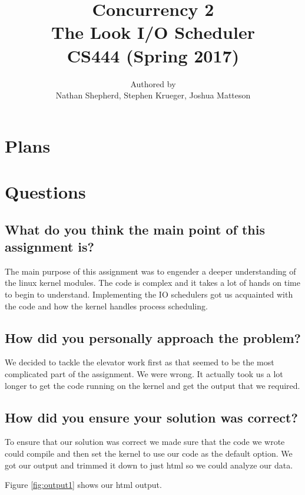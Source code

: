 \documentclass[letterpaper,10pt,titlepage, onecolumn, compsoc]{IEEEtran}
\title{Concurrency 2 \\The Look I/O Scheduler \\ \vspace{2mm}\small CS444 (Spring 2017)}
\author{Authored by \\ Nathan Shepherd, Stephen Krueger, Joshua Matteson }
\begin{document}
\maketitle
\newpage


\section{Plans}




\section{Questions}

\subsection{What do you think the main point of this assignment is?}
The main purpose of this assignment was to engender a deeper understanding of the linux kernel modules. The code is complex and it takes a lot of hands on time to begin to understand. Implementing the IO schedulers got us acquainted with the code and how the kernel handles process scheduling.      

\subsection{How did you personally approach the problem?}

We decided to tackle the elevator work first as that seemed to be the most complicated part of the assignment. 
We were wrong. It actually took us a lot longer to get the code running on the kernel and get the output that we required. 


\subsection{How did you ensure your solution was correct?}
To ensure that our solution was correct we made sure that the code we wrote could compile and then set the kernel to use our code as the default option. We got our output and trimmed it down to just html so we could analyze our data. 

Figure \ref{fig:output1} shows our html output.
\end{document}
